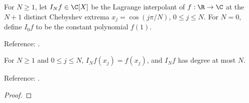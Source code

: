\begin{definition}
\label{def:extrema-interpolant}
\leanok
For $N\ge1$, let $I_Nf\in\C[X]$ be the Lagrange interpolant of $f:\R\to\C$ at the
$N+1$ distinct Chebyshev extrema $x_j=\cos(j\pi/N)$, $0\le j\le N$.
For $N=0$, define $I_0f$ to be the constant polynomial $f(1)$.

Reference: \cite[Chapters 4 and 8]{atap}.
\end{definition}

\begin{theorem}
\label{thm:extrema-interpolant-basic}
\leanok
For $N\ge1$ and $0\le j\le N$, $I_Nf(x_j)=f(x_j)$, and $I_Nf$ has degree at
most $N$.

Reference: \cite[Chapter 4]{atap}.
\end{theorem}
\begin{proof}
\leanok
\end{proof}

